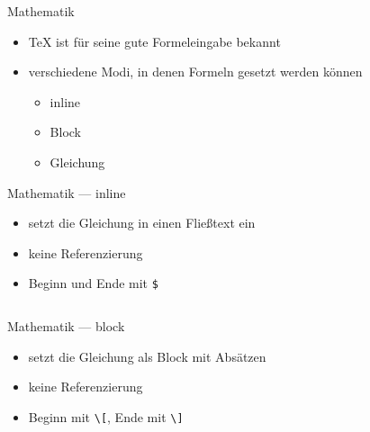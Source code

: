\documentclass[presentation,aspectratio=169]{beamer}
\begin{document}
\begin{frame}{Mathematik}
  \begin{itemize}
    \item \TeX{} ist für seine gute Formeleingabe bekannt
    \item verschiedene Modi, in denen Formeln gesetzt werden können
      \begin{itemize}
        \item inline
        \item Block
        \item Gleichung
      \end{itemize}
  \end{itemize}
\end{frame}

\begin{frame}[fragile]{Mathematik --- inline}
  \begin{itemize}
    \item setzt die Gleichung in einen Fließtext ein
    \item keine Referenzierung
    \item Beginn und Ende mit \verb|$|
  \end{itemize}
  
  \begin{minipage}{.4\textwidth}
    
  \end{minipage}
  \hfill
  \begin{minipage}{.5\textwidth}
    \inputminted{latex}{codebeispiele/math-inline.tex}
  \end{minipage}
\end{frame}

\begin{frame}[fragile]{Mathematik --- block}
  \begin{itemize}
    \item setzt die Gleichung als Block mit Absätzen
    \item keine Referenzierung
    \item Beginn mit \verb|\[|, Ende mit \verb|\]|
  \end{itemize}
  
  \begin{minipage}{.4\textwidth}
    
  \end{minipage}
  \hfill
  \begin{minipage}{.5\textwidth}
    \inputminted{latex}{codebeispiele/math-block.tex}
  \end{minipage}
\end{frame}
\end{document}
